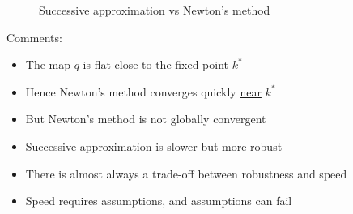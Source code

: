 \begin{frame}
    
    \begin{figure}
       \centering
       \caption{\label{f:newton_solow_45} Successive approximation vs Newton's method}
    \end{figure}

\end{frame}

\begin{frame}
    
    Comments:
    \begin{itemize}
        \item The map $q$ is flat close to the fixed point $k^*$
            \vspace{0.5em}
        \item Hence Newton's method converges quickly \underline{near} $k^*$
            \vspace{0.5em}
        \item But Newton's method is not globally convergent
            \vspace{0.5em}
        \item Successive approximation is slower but more robust
    \end{itemize}


    \begin{itemize}
        \item There is almost always a trade-off between robustness and speed
            \vspace{0.5em}
        \item Speed requires assumptions, and assumptions can fail
    \end{itemize}


\end{frame}


